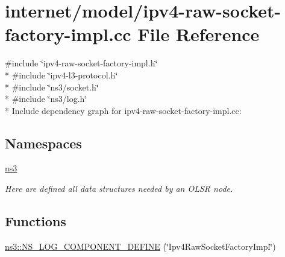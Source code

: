 \hypertarget{ipv4-raw-socket-factory-impl_8cc}{}\section{internet/model/ipv4-\/raw-\/socket-\/factory-\/impl.cc File Reference}
\label{ipv4-raw-socket-factory-impl_8cc}
{\ttfamily \#include \char`\"{}ipv4-\/raw-\/socket-\/factory-\/impl.\+h\char`\"{}}\\*
{\ttfamily \#include \char`\"{}ipv4-\/l3-\/protocol.\+h\char`\"{}}\\*
{\ttfamily \#include \char`\"{}ns3/socket.\+h\char`\"{}}\\*
{\ttfamily \#include \char`\"{}ns3/log.\+h\char`\"{}}\\*
Include dependency graph for ipv4-\/raw-\/socket-\/factory-\/impl.cc\+:
\subsection*{Namespaces}
\begin{DoxyCompactItemize}
\item 
 \hyperlink{namespacens3}{ns3}
\begin{DoxyCompactList}\small\item\em Here are defined all data structures needed by an O\+L\+SR node. \end{DoxyCompactList}\end{DoxyCompactItemize}
\subsection*{Functions}
\begin{DoxyCompactItemize}
\item 
\hyperlink{namespacens3_ac7076a99d2af0ae71271817d4edff76a}{ns3\+::\+N\+S\+\_\+\+L\+O\+G\+\_\+\+C\+O\+M\+P\+O\+N\+E\+N\+T\+\_\+\+D\+E\+F\+I\+NE} (\char`\"{}Ipv4\+Raw\+Socket\+Factory\+Impl\char`\"{})
\end{DoxyCompactItemize}
